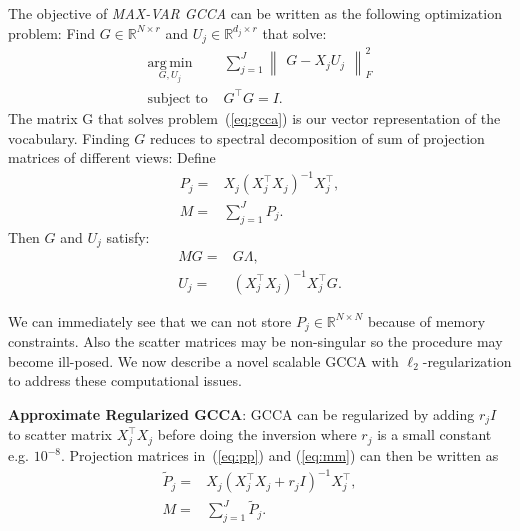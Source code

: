 \documentclass[11pt]{article}
\begin{document}
The objective of \emph{MAX-VAR GCCA} can be written as the following optimization problem:
 Find $G \in \mathbb{R}^{N\times r}$ and $U_j \in
\mathbb{R}^{d_j \times r}$ that solve:
\begin{equation}
  \label{eq:gcca}
\begin{split}
  \operatorname*{\arg\,\min}_{G,U_j} & \sum_{j=1}^J \begin{Vmatrix} G - X_jU_j \end{Vmatrix}^2_F \\
  \text{subject to } & G^\top G = I.
\end{split}
\end{equation}
The matrix G that solves problem~(\ref{eq:gcca}) is our vector representation of the vocabulary. Finding $G$ reduces to spectral decomposition of sum of projection matrices of different views: Define
\begin{align}
P_j =& X_j(X_j^\top X_j)^{-1}X_j^\top, \label{eq:pp}\\
M =& \sum_{j=1}^J P_j. \label{eq:mm}
\end{align}
Then $G$ and $U_j$ satisfy:
\begin{align}
M G =& G \Lambda,\\
U_j =& \left(X_j^\top X_j\right)^{-1} X_j^\top G.
\end{align}


We can immediately see that we can not store
 $P_j \in \mathbb{R}^{N \times N}$ because of memory constraints.
Also the scatter matrices may be non-singular so the procedure may become
ill-posed. 
We now describe a novel scalable GCCA with $\ell_2$-regularization to address these computational issues. 

\noindent\textbf{Approximate Regularized GCCA}: GCCA can be regularized by adding $r_jI$ to 
scatter matrix $X_j^\top X_j$ before doing the inversion where
$r_j$ is a small constant e.g. $10^{-8}$. 
Projection matrices in~(\ref{eq:pp}) and (\ref{eq:mm}) can then be written as
\begin{align}
  \widetilde{P}_{j} =& X_j(X_j^\top X_j+r_jI)^{-1}X_j^\top, \label{eq:6}\\
  M =& \sum_{j=1}^J \widetilde{P}_{j}. \label{eq:mmm}
\end{align}
\end{document}
